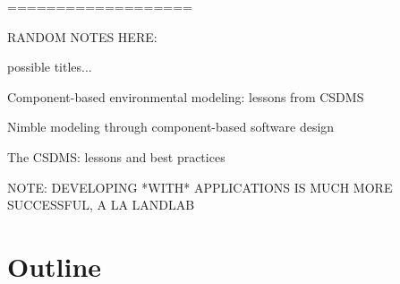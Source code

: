 \documentclass[12pt]{amsart}
\begin{document}
 













===================

RANDOM NOTES HERE:

possible titles...

Component-based environmental modeling: lessons from CSDMS

Nimble modeling through component-based software design

The CSDMS: lessons and best practices



NOTE: DEVELOPING *WITH* APPLICATIONS IS MUCH MORE SUCCESSFUL, A LA LANDLAB




\section*{Outline}
\end{document}
